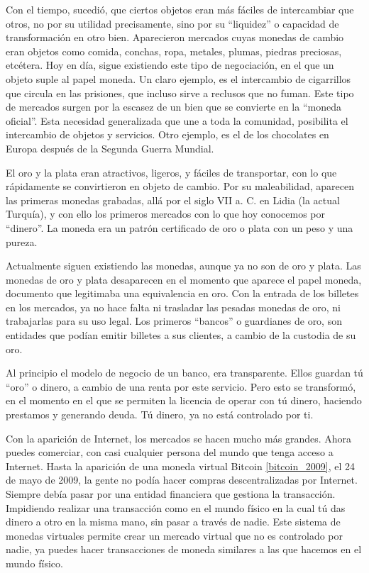 \documentclass[a4paper, 12pt]{book}
\begin{document}
Con el tiempo, sucedió, que ciertos objetos eran más fáciles de intercambiar que 
otros, no por su utilidad precisamente, sino por su ``liquidez'' o capacidad de 
transformación en otro bien.  Aparecieron mercados cuyas monedas de cambio eran 
objetos como comida, conchas, ropa, metales, plumas, piedras preciosas, 
etcétera. Hoy en día, sigue existiendo este tipo de negociación, en el que un 
objeto suple al papel moneda. Un claro ejemplo, es el intercambio de cigarrillos 
que circula en las prisiones, que incluso sirve a reclusos que no fuman. Este 
tipo de mercados surgen por la escasez de un bien que se convierte en la 
``moneda oficial''. Esta necesidad generalizada que une a toda la comunidad, 
posibilita el intercambio de objetos y servicios. Otro ejemplo, es el de los 
chocolates en Europa después de la Segunda Guerra Mundial.

El oro y la plata eran atractivos, ligeros, y fáciles de transportar, con lo 
que rápidamente se convirtieron en objeto de cambio. Por su maleabilidad, 
aparecen las primeras monedas grabadas, allá por el siglo VII a. C. en Lidia 
(la actual Turquía), y con ello los primeros mercados con lo que hoy conocemos 
por ``dinero''. La moneda era un patrón certificado de oro o plata con un peso 
y una pureza.

Actualmente siguen existiendo las monedas, aunque ya no son de oro y plata. 
Las monedas de oro y plata desaparecen en el momento que aparece el papel 
moneda, documento que legitimaba una equivalencia en oro. Con la entrada de los 
billetes en los mercados, ya no hace falta ni trasladar las pesadas monedas de 
oro, ni trabajarlas para su uso legal. Los primeros ``bancos'' o guardianes de 
oro, son entidades que podían emitir billetes a sus clientes, a cambio de la 
custodia de su oro.

Al principio el modelo de negocio de un banco, era transparente. Ellos guardan 
tú ``oro'' o dinero, a cambio de una renta por este servicio. Pero esto se 
transformó, en el momento en el que se permiten la licencia de operar con tú 
dinero, haciendo prestamos y generando deuda. Tú dinero, ya no está controlado 
por ti.

Con la aparición de Internet, los mercados se hacen mucho más grandes. Ahora 
puedes comerciar, con casi cualquier persona del mundo que tenga acceso a 
Internet. Hasta la aparición de una moneda virtual Bitcoin \ref{bitcoin_2009}, 
el 24 de mayo de 2009, la gente no podía hacer compras descentralizadas por 
Internet. Siempre debía pasar por una entidad financiera que gestiona la 
transacción. Impidiendo realizar una transacción como en el mundo físico en la 
cual tú das dinero a otro en la misma mano, sin pasar a través de nadie. 
Este sistema de monedas virtuales permite crear un mercado virtual que no es 
controlado por nadie, ya puedes hacer transacciones de moneda similares a las 
que hacemos en el mundo físico.
\end{document}
